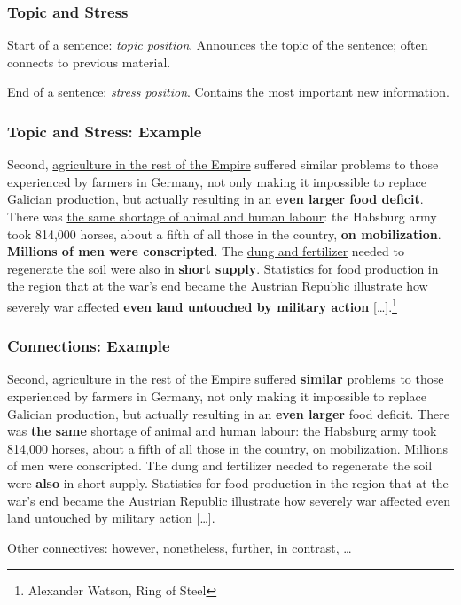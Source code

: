 \documentclass[xetex]{beamer}
\begin{document}
\begin{frame}
  \frametitle{Topic and Stress}

  Start of a sentence: \emph{topic position}.
  Announces the topic of the sentence; often connects to previous material.

  \medskip

  End of a sentence: \emph{stress position}.
  Contains the most important new information.
\end{frame}

\begin{frame}
  \frametitle{Topic and Stress: Example}

  \small
  Second, \underline{agriculture in the rest of the Empire} suffered similar problems to those experienced by farmers in Germany, not only making it impossible to replace Galician production, but actually resulting in an \textbf{even larger food deficit}.
  There was \underline{the same shortage of animal and human labour}: the Habsburg army took 814,000 horses, about a fifth of all those in the country, \textbf{on mobilization}.
  \textbf{Millions of men were conscripted}.
  The \underline{dung and fertilizer} needed to regenerate the soil were also in \textbf{short supply}.
  \underline{Statistics for food production} in the region that at the war's end became the Austrian Republic illustrate how severely war affected \textbf{even land untouched by military action} [\dots].\footnote{Alexander Watson, Ring of Steel}
\end{frame}

\begin{frame}
  \frametitle{Connections: Example}

  {
  \small
  Second, agriculture in the rest of the Empire suffered \textbf{similar} problems to those experienced by farmers in Germany, not only making it impossible to replace Galician production, but actually resulting in an \textbf{even larger} food deficit.
  There was \textbf{the same} shortage of animal and human labour: the Habsburg army took 814,000 horses, about a fifth of all those in the country, on mobilization.
  Millions of men were conscripted.
  The dung and fertilizer needed to regenerate the soil were \textbf{also} in short supply.
  Statistics for food production in the region that at the war's end became the Austrian Republic illustrate how severely war affected even land untouched by military action [\dots].
  }

  \medskip

  Other connectives: however, nonetheless, further, in contrast, \dots
\end{frame}
\end{document}
